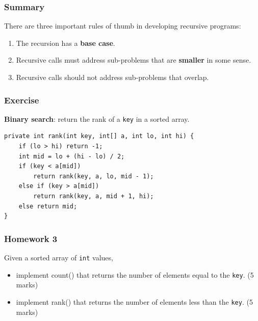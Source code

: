 \documentclass[aspectratio=169, 14pt]{beamer}
\begin{document}
\begin{frame}
\frametitle{Summary}

{\large {}} There are three important rules of thumb in developing recursive programs:

\begin{enumerate}
    \item The recursion has a \textbf{base case}.
    \item Recursive calls must address sub-problems that are \textbf{smaller} in some sense.
    \item Recursive calls should not address sub-problems that overlap.
\end{enumerate}
\end{frame}

\begin{frame}[fragile]
    \frametitle{Exercise}
{\large {}} \textbf{Binary search}: return the rank of a \texttt{key} in a sorted array.    

  \begin{verbatim}
private int rank(int key, int[] a, int lo, int hi) {
    if (lo > hi) return -1;
    int mid = lo + (hi - lo) / 2;
    if (key < a[mid]) 
        return rank(key, a, lo, mid - 1);
    else if (key > a[mid])
        return rank(key, a, mid + 1, hi);
    else return mid;
}
  \end{verbatim}

\end{frame}

\begin{frame}
    \frametitle{Homework 3}
    Given a sorted array of \texttt{int} values,
    \begin{itemize}
        \item implement \alert{count()} that returns the number of elements equal to the \texttt{key}. (5 marks)
        \item implement \alert{rank()} that returns the number of elements less than the \texttt{key}. (5 marks) 
    \end{itemize}

\end{frame}
\end{document}
